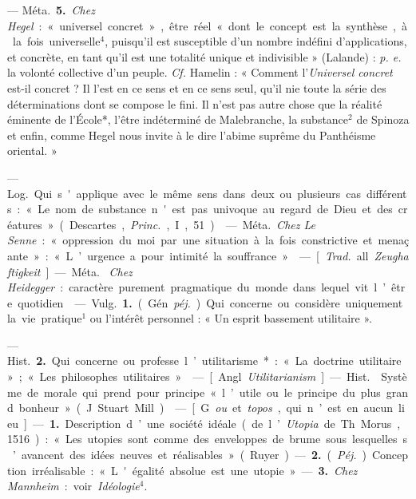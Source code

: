 \begin{itemize}[leftmargin=1cm, label=, itemsep=1pt]
— \si{Méta.} {\bf 5.} {\it Chez Hegel} : « universel concret », être réel «
dont le concept est la synthèse, à la fois universelle$^4$, puisqu'il est
susceptible d’un nombre indéfini d'applications, et concrète, en tant qu'il
est une totalité unique et indivisible » (Lalande) : {\it p. e.} la volonté
collective d’un peuple. {\it Cf.} Hamelin : « Comment l'{\it Universel
concret} est-il concret ? Il l'est en ce sens et en ce sens seul, qu'il nie
toute la série des déterminations dont se compose le fini. Il n’est pas autre
chose que la réalité éminente de l’École*, l'être
indéterminé de Malebranche, la substance$^2$ de Spinoza et enfin, comme Hegel
nous invite à le dire l’abime suprême du Panthéisme oriental. »

 — \si{Log.} Qui s'applique avec le même sens dans deux ou
plusieurs cas différents : « Le nom de substance n'est pas univoque au regard
de Dieu et des créatures » (Descartes, {\it Princ.}, I, 51).

 — \si{Méta.} {\it Chez Le Senne} : « oppression du moi par une
situation à la fois constrictive et menaçante » : « L’urgence a pour intimité
la souffrance. »

 — [{\it Trad.} all. {\it Zeughaftigkeit}] — \si{Méta.} {\it
Chez Heidegger} : caractère purement pragmatique du monde dans lequel vit
l’être quotidien.

 — \si{Vulg.} {\bf 1.} (Gén. {\it péj.}) Qui concerne ou
considère uniquement la vie pratique$^1$ ou l'intérêt personnel : « Un esprit
bassement utilitaire ».

— \si{Hist.} {\bf 2.} Qui concerne ou professe l’utilitarisme* : « La doctrine
utilitaire » ; « Les philosophes utilitaires ».

 — [Angl. {\it Utilitarianism}] — \si{Hist.} 
Système de morale qui prend pour principe « l’utile ou le principe du plus
grand bonheur » (J. Stuart Mill).

 — [G. {\it ou} et {\it topos}, qui n’est en aucun lieu] —
{\bf 1.} Description d’une société idéale (de l’{\it Utopia} de Th. Morus,
1516) : « Les utopies sont comme des enveloppes de brume sous lesquelles
s’avancent des idées neuves et réalisables » (Ruyer). — {\bf 2.}
({\it Péj.}). Conception irréalisable : « L'égalité absolue est une utopie ».
— {\bf 3.} {\it Chez Mannheim} : voir {\it Idéologie}$^4$.

	\end{itemize}
